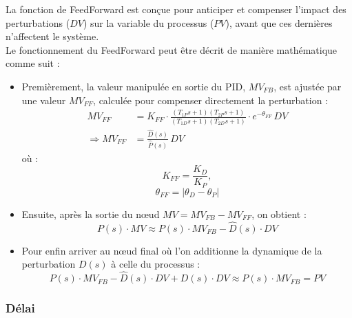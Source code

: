La fonction de FeedForward est conçue pour anticiper et compenser l'impact des perturbations ($DV$) sur la variable du processus ($PV$), 
avant que ces dernières n'affectent le système.
\\Le fonctionnement du FeedForward peut être décrit de manière mathématique comme suit : 
\begin{itemize}
	\item 
	 Premièrement, la valeur manipulée en sortie du PID, $MV_{FB}$, est ajustée par une valeur $MV_{FF}$, calculée pour compenser directement la perturbation :
    \begin{align}\label{eq:1}
        MV_{FF} &= K_{FF}\cdot\frac{(T_{1P}s + 1)(T_{2P}s + 1)}{(T_{1D}s + 1)(T_{2D}s + 1)}\cdot e^{-\theta_{FF}}\,DV\\ 
        \Rightarrow MV_{FF} &= \frac{\hat{D}(s)}{\hat{P}(s)}\,DV
    \end{align}
	où : 
	\begin{equation}\label{eq:2}
		K_{FF} = \frac{K_D}{K_P},
	\end{equation}
	\begin{equation}\label{eq:3}
		\theta_{FF} = |\theta_D - \theta_P|
	\end{equation}
	\item 
	Ensuite, après la sortie du n\oe{}ud $MV = MV_{FB} - MV_{FF}$, on obtient : 
	\begin{equation}\label{eq:4}
		P(s)\cdot MV \approx P(s)\cdot MV_{FB} - \hat{D}(s)\cdot DV
	\end{equation}
	\item
	 Pour enfin arriver au n\oe{}ud final où l'on additionne la dynamique de la perturbation $D(s)$ à celle du processus : 
	\begin{equation}\label{eq:5}
		P(s)\cdot MV_{FB} - \hat{D}(s)\cdot DV + D(s)\cdot DV \approx P(s)\cdot MV_{FB} = PV
	\end{equation}
\end{itemize}
\subsubsection{Délai}


